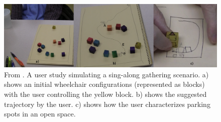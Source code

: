 \begin{figure}
\centering
\includegraphics[width=5in]{figures/bikramjoe.png}
\caption{From \cite{adhikari2014single}. A user study simulating a sing-along
gathering scenario. a) shows an initial wheelchair configurations (represented as
blocks) with the user controlling the yellow block. b) shows the suggested
trajectory by the user. c) shows how the user characterizes parking spots in an
open space.}
\label{fig:bikramjoe}
\end{figure}

% 
% 
% 
% 
% 
% 


